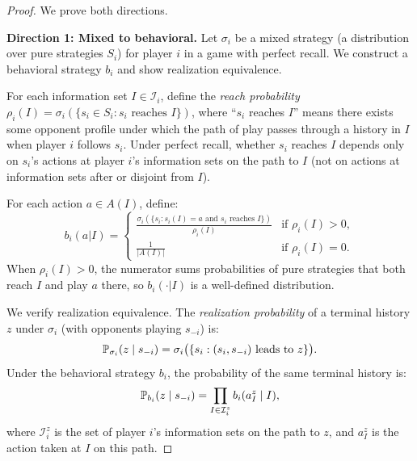 \documentclass[11pt,a4paper]{article}
\begin{document}
\begin{proof}
We prove both directions.

\textbf{Direction 1: Mixed to behavioral.}
Let $\sigma_i$ be a mixed strategy (a distribution over pure strategies
$S_i$) for player $i$ in a game with perfect recall. We construct a
behavioral strategy $b_i$ and show realization equivalence.

For each information set $I \in \mathcal{I}_i$, define the \emph{reach
probability} $\rho_i(I) = \sigma_i(\{s_i \in S_i : s_i \text{ reaches } I\})$,
where ``$s_i$ reaches $I$'' means there exists some opponent profile under
which the path of play passes through a history in $I$ when player $i$
follows $s_i$. Under perfect recall, whether $s_i$ reaches $I$ depends only
on $s_i$'s actions at player $i$'s information sets on the path to $I$
(not on actions at information sets after or disjoint from $I$).

For each action $a \in A(I)$, define:
\[
    b_i(a | I) = \begin{cases}
    \displaystyle\frac{\sigma_i(\{s_i : s_i(I) = a \text{ and }
    s_i \text{ reaches } I\})}{\rho_i(I)}
    & \text{if } \rho_i(I) > 0, \\[6pt]
    \displaystyle\frac{1}{|A(I)|} & \text{if } \rho_i(I) = 0.
    \end{cases}
\]
When $\rho_i(I) > 0$, the numerator sums probabilities of pure strategies
that both reach $I$ and play $a$ there, so $b_i(\cdot | I)$ is a well-defined
distribution.

We verify realization equivalence. The \emph{realization probability} of a
terminal history $z$ under $\sigma_i$ (with opponents playing $s_{-i}$) is:
\[
    \mathbb{P}_{\sigma_i}(z \mid s_{-i})
    = \sigma_i\big(\{s_i : (s_i, s_{-i}) \text{ leads to } z\}\big).
\]
Under the behavioral strategy $b_i$, the probability of the same terminal
history is:
\[
    \mathbb{P}_{b_i}(z \mid s_{-i})
    = \prod_{I \in \mathcal{I}_i^z} b_i(a_I^z \mid I),
\]
where $\mathcal{I}_i^z$ is the set of player $i$'s information sets on the
path to $z$, and $a_I^z$ is the action taken at $I$ on this path.


\end{proof}
\end{document}
